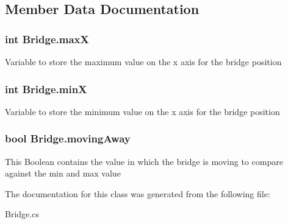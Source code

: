 \subsection{Member Data Documentation}
\hypertarget{class_bridge_aed083b15a35e1694d1158f47dd4195ef}{
\subsubsection[{max\-X}]{\setlength{\rightskip}{0pt plus 5cm}int Bridge.\-max\-X}}\label{class_bridge_aed083b15a35e1694d1158f47dd4195ef}
Variable to store the maximum value on the x axis for the bridge position \hypertarget{class_bridge_af027428ee13264f7027c58609c8ad9f9}{
\subsubsection[{min\-X}]{\setlength{\rightskip}{0pt plus 5cm}int Bridge.\-min\-X}}\label{class_bridge_af027428ee13264f7027c58609c8ad9f9}
Variable to store the minimum value on the x axis for the bridge position \hypertarget{class_bridge_abafb52bd877ba842d7645dd15e2ac85d}{
\subsubsection[{moving\-Away}]{\setlength{\rightskip}{0pt plus 5cm}bool Bridge.\-moving\-Away}}\label{class_bridge_abafb52bd877ba842d7645dd15e2ac85d}
This Boolean contains the value in which the bridge is moving to compare against the min and max value 

The documentation for this class was generated from the following file\-:\begin{DoxyCompactItemize}
\item 
Bridge.\-cs\end{DoxyCompactItemize}
